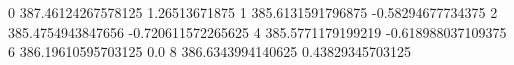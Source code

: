 0 387.46124267578125 1.26513671875
1 385.6131591796875 -0.58294677734375
2 385.4754943847656 -0.720611572265625
4 385.5771179199219 -0.618988037109375
6 386.19610595703125 0.0
8 386.6343994140625 0.43829345703125
